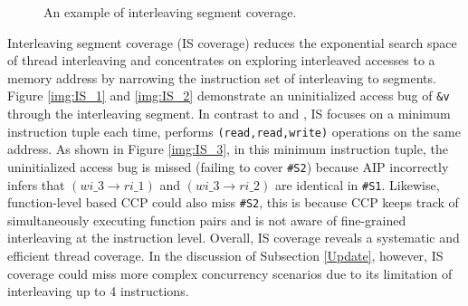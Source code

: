 \begin{figure*}[!t]
        \centering
        \hspace{10pt}\vline\hspace{10pt}
        \hspace{10pt}\vline\hspace{10pt}
        \caption{An example of interleaving segment coverage.}
\end{figure*}

Interleaving segment coverage (IS coverage) \cite{jeong2023segfuzz} reduces the exponential search space of thread interleaving and concentrates on exploring interleaved accesses to a memory address by narrowing the instruction set of interleaving to segments. Figure \ref{img:IS_1} and \ref{img:IS_2} demonstrate an uninitialized access bug of \texttt{\&v} through the interleaving segment. In contrast to \cite{xu2020krace} and \cite{CONZZER2022context}, IS focuses on a minimum instruction tuple each time, \ie performs \texttt{(read,read,write)} operations on the same address. As shown in Figure \ref{img:IS_3}, in this minimum instruction tuple, the uninitialized access bug is missed (failing to cover \texttt{\#S2}) because AIP incorrectly infers that $(wi\_3 \rightarrow ri\_1)$ and $(wi\_3 \rightarrow ri\_2)$ are identical in \texttt{\#S1}. Likewise, function-level based CCP could also miss \texttt{\#S2}, this is because CCP keeps track of simultaneously executing function pairs and is not aware of fine-grained interleaving at the instruction level. Overall, IS coverage reveals a systematic and efficient thread coverage. In the discussion of Subsection \ref{Update}, however, IS coverage could miss more complex concurrency scenarios due to its limitation of interleaving up to 4 instructions.

